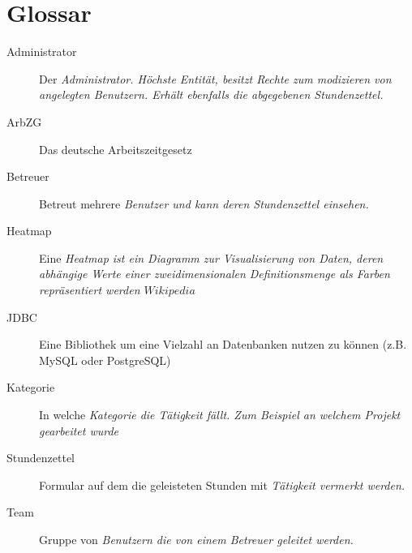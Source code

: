 \section{Glossar}
\begin{description}
	\item[Administrator] Der \em{Administrator}. Höchste Entität, besitzt Rechte zum modizieren von angelegten \em{Benutzern}.
	               Erhält ebenfalls die \em{abgegebenen Stundenzettel}.

	\item[ArbZG] Das deutsche Arbeitszeitgesetz

	\item[Betreuer] Betreut mehrere \em{Benutzer} und kann deren \em{Stundenzettel} einsehen.

	\item[Heatmap] Eine \em{Heatmap} ist ein Diagramm zur Visualisierung von Daten, deren abhängige Werte einer zweidimensionalen Definitionsmenge als Farben repräsentiert werden \em{\(Wikipedia\)}

	\item[JDBC] Eine Bibliothek um eine Vielzahl an Datenbanken nutzen zu können (z.B. MySQL oder PostgreSQL)

	\item[Kategorie] In welche \em{Kategorie} die \em{Tätigkeit} fällt. Zum Beispiel an welchem Projekt gearbeitet wurde

	\item[Stundenzettel] Formular auf dem die geleisteten Stunden mit \em{Tätigkeit} vermerkt werden.

	\item[Team] Gruppe von \em{Benutzern} die von einem \em{Betreuer} geleitet werden.

\end{description}
